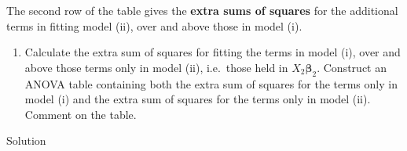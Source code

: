 \documentclass[
]{book}
\providecommand{\tightlist}{%
  \setlength{\itemsep}{0pt}\setlength{\parskip}{0pt}}
\theoremstyle{definition}
\theoremstyle{definition}
\theoremstyle{definition}
\theoremstyle{definition}
\theoremstyle{remark}
\begin{document}
\begin{enumerate}
  The second row of the table gives the \textbf{extra sums of squares} for the additional terms in fitting model (ii), over and above those in model (i).

  \begin{enumerate}
  \def\labelenumii{\alph{enumii}.}
  \setcounter{enumii}{2}
  \tightlist
  \item
    Calculate the extra sum of squares for fitting the terms in model (i), over and above those terms only in model (ii), i.e.~those held in \(X_2\boldsymbol{\beta}_2\). Construct an ANOVA table containing both the extra sum of squares for the terms only in model (i) and the extra sum of squares for the terms only in model (ii). Comment on the table.
  \end{enumerate}
\end{enumerate}

Solution
\end{document}
